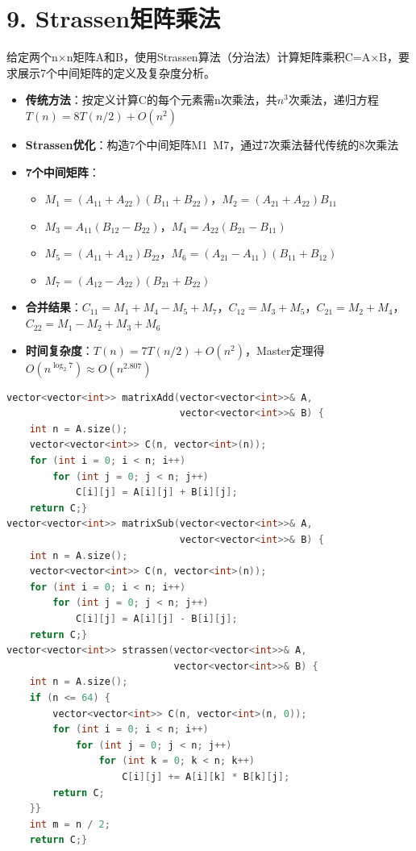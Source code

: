 \section*{9. Strassen矩阵乘法}

给定两个n$\times$n矩阵A和B，使用Strassen算法（分治法）计算矩阵乘积C=A$\times$B，要求展示7个中间矩阵的定义及复杂度分析。

\begin{itemize}
    \item \textbf{传统方法}：按定义计算C的每个元素需n次乘法，共$n^3$次乘法，递归方程$T(n)=8T(n/2)+O(n^2)$
    \item \textbf{Strassen优化}：构造7个中间矩阵M1~M7，通过7次乘法替代传统的8次乘法
    \item \textbf{7个中间矩阵}：
    \begin{itemize}
        \item $M_1=(A_{11}+A_{22})(B_{11}+B_{22})$，$M_2=(A_{21}+A_{22})B_{11}$
        \item $M_3=A_{11}(B_{12}-B_{22})$，$M_4=A_{22}(B_{21}-B_{11})$
        \item $M_5=(A_{11}+A_{12})B_{22}$，$M_6=(A_{21}-A_{11})(B_{11}+B_{12})$
        \item $M_7=(A_{12}-A_{22})(B_{21}+B_{22})$
    \end{itemize}
    \item \textbf{合并结果}：$C_{11}=M_1+M_4-M_5+M_7$，$C_{12}=M_3+M_5$，$C_{21}=M_2+M_4$，$C_{22}=M_1-M_2+M_3+M_6$
    \item \textbf{时间复杂度}：$T(n)=7T(n/2)+O(n^2)$，Master定理得$O(n^{\log_2 7}) \approx O(n^{2.807})$
\end{itemize}

\begin{lstlisting}[language=C++, style=cppstyle]
vector<vector<int>> matrixAdd(vector<vector<int>>& A,
                              vector<vector<int>>& B) {
    int n = A.size();
    vector<vector<int>> C(n, vector<int>(n));
    for (int i = 0; i < n; i++)
        for (int j = 0; j < n; j++)
            C[i][j] = A[i][j] + B[i][j];
    return C;}
vector<vector<int>> matrixSub(vector<vector<int>>& A,
                              vector<vector<int>>& B) {
    int n = A.size();
    vector<vector<int>> C(n, vector<int>(n));
    for (int i = 0; i < n; i++)
        for (int j = 0; j < n; j++)
            C[i][j] = A[i][j] - B[i][j];
    return C;}
vector<vector<int>> strassen(vector<vector<int>>& A,
                             vector<vector<int>>& B) {
    int n = A.size();
    if (n <= 64) {
        vector<vector<int>> C(n, vector<int>(n, 0));
        for (int i = 0; i < n; i++)
            for (int j = 0; j < n; j++)
                for (int k = 0; k < n; k++)
                    C[i][j] += A[i][k] * B[k][j];
        return C;
    }}
    int m = n / 2;
    return C;}
\end{lstlisting}

